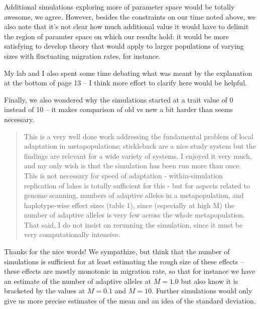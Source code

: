 Additional simulations exploring more of parameter space would be totally awesome, we agree.
However, besides the constraints on our time noted above,
we also note that it's not clear how much additional value it would have to delimit
the region of paramter space on which our results hold:
it would be more satisfying to develop theory that would apply to
larger populations of varying sizes with fluctuating migration rates, for instance.

\begin{point}{\revref}
    My lab and I also spent some time debating what was meant by the explanation at the
    bottom of page 13 -- I think more effort to clarify here would be helpful.
\end{point}


\begin{point}{}
    Finally, we also wondered why the simulations started at a trait value of 0
    instead of 10 -- it makes comparison of old vs new a bit harder than seems
    necessary. 
\end{point}







\begin{quote}
This is a very well done work addressing the fundamental problem of local
adaptation in metapopulations; stickleback are a nice study system but the
findings are relevant for a wide variety of systems. I enjoyed it very much,
and my only wish is that the simulation has been run more than once. This is
not necessary for speed of adaptation - within-simulation replication of lakes
is totally sufficient for this - but for aspects related to genome scanning,
numbers of adaptive alleles in a metapopulation, and haplotype-wise effect
sizes (table 1), since (especially at high M) the number of adaptive alleles is
very few across the whole metapopulation. That said, I do not insist on
rerunning the simulation, since it must be very computationally intensive.
\end{quote}

Thanks for the nice words!
We sympathize, but think that the number of simulations is sufficient
for at least estimating the rough size of these effects -- 
these effects are mostly monotonic in migration rate,
so that for instance we have an estimate of the number of adaptive alleles at $M=1.0$
but also know it is bracketed by the values at $M=0.1$ and $M=10$.
Further simulations would only give us more precise estimates of the mean
and an idea of the standard deviation.


